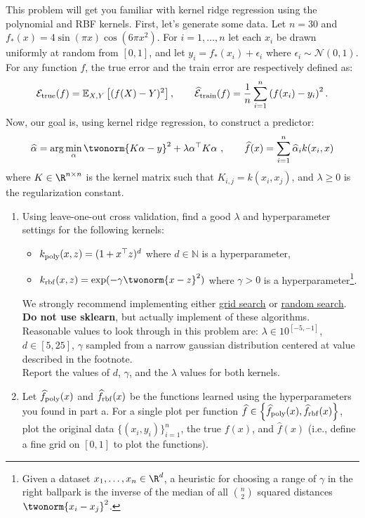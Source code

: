 \documentclass{article}
\begin{document}
\begin{aprob}
    This problem will get you familiar with kernel ridge regression using the polynomial and RBF kernels.
    First, let's generate some data. Let $n=30$ and $f_*(x) = 4 \sin(\pi x)\cos(6\pi x^2)$.
    For $i=1,\dots,n$ let each $x_i$ be drawn uniformly at random from $[0,1]$, and let $y_i = f_*(x_i) + \epsilon_i$ where $\epsilon_i \sim \mathcal{N}(0,1)$.
    For any function $f$, the true error and the train error are respectively defined as:
    $$\mathcal{E}_{\rm true}(f) = \mathbb{E}_{X,Y}\left[(f(X) - Y)^2\right], \quad \quad  \widehat{\mathcal{E}}_{\rm train}(f) =  \frac{1}{n} \sum_{i=1}^n \left(f(x_i)-y_i\right)^2.$$
    Now, our goal is, using kernel ridge regression, to construct a predictor:
    $$\widehat{\alpha} = \arg\min_\alpha \twonorm{K\alpha - y}^2 + \lambda \alpha^\top K \alpha \ , \quad \quad \widehat{f}(x) = \sum_{i=1}^n \widehat{\alpha}_i k(x_i,x)$$
    where $K\in\R^{n\times n}$ is the kernel matrix such that $K_{i,j} = k(x_i,x_j)$, and $\lambda\geq 0$ is the regularization constant.
    
    \begin{enumerate}
        \item {} Using leave-one-out cross validation, find a good $\lambda$ and hyperparameter settings for the following kernels:
        \begin{itemize}
            \item $k_{\rm poly}(x,z) = (1+x^\top z)^d$ where $d \in \mathbb{N}$ is a hyperparameter, 
            \item $k_{\rm rbf}(x,z) = \exp(-\gamma \twonorm{x-z}^2)$ where $\gamma > 0$ is a hyperparameter\footnote{Given a dataset $x_1,\dots,x_n \in \R^d$, a heuristic for choosing a range of $\gamma$ in the right ballpark is the inverse of the median of all $\binom{n}{2}$ squared distances $\twonorm{x_i-x_j}^2$.}.
        \end{itemize}
        We strongly recommend implementing either \href{https://en.wikipedia.org/wiki/Hyperparameter_optimization#Grid_search}{grid search} or \href{https://en.wikipedia.org/wiki/Hyperparameter_optimization#Random_search}{random search}. \textbf{Do not use sklearn}, but actually implement of these algorithms. Reasonable values to look through in this problem are: $\lambda \in 10^{[-5, -1]}$, $d \in [5, 25]$, $\gamma$ sampled from a narrow gaussian distribution centered at value described in the footnote. \\
        Report the values of $d$, $\gamma$, and the $\lambda$ values for both kernels.
        \item {} Let $\widehat{f}_{\rm poly}(x)$ and $\widehat{f}_{\rm rbf}(x)$ be the functions learned using the hyperparameters you found in part a.
        For a single plot per function $\widehat{f} \in \left\lbrace \widehat{f}_{\rm poly}(x), \widehat{f}_{\rm rbf}(x) \right\rbrace$, plot the original data $\{(x_i,y_i)\}_{i=1}^n$, the true $f(x)$, and $\widehat{f}(x)$ (i.e., define a fine grid on $[0,1]$ to plot the functions).
        \iffalse {}
        

\end{enumerate}
\end{aprob}
\end{document}
